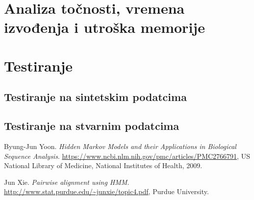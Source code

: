 \documentclass[a4paper]{article}
\begin{document}
\section{Analiza točnosti, vremena izvođenja i utroška memorije}

\section{Testiranje}
\subsection{Testiranje na sintetskim podatcima}
\subsection{Testiranje na stvarnim podatcima}

\newpage
\begin{thebibliography}{9}
Byung-Jun Yoon. 
\textit{Hidden Markov Models and their Applications in Biological Sequence Analysis}.
\url{https://www.ncbi.nlm.nih.gov/pmc/articles/PMC2766791}, 
 US National Library of Medicine, National Institutes of Health, 2009.


Jun Xie. 
\textit{Pairwise alignment using HMM}.
\url{http://www.stat.purdue.edu/~junxie/topic4.pdf},
 Purdue University.


\end{thebibliography}
\end{document}
